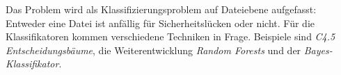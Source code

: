 Das Problem wird als Klassifizierungsproblem auf Dateiebene aufgefasst:
Entweder eine Datei ist anfällig für Sicherheitslücken oder nicht.
Für die Klassifikatoren kommen verschiedene Techniken in Frage.
Beispiele sind \emph{C4.5 Entscheidungsbäume}\cite{decision_trees}, die Weiterentwicklung \emph{Random Forests} und der \emph{Bayes-Klassifikator}.

